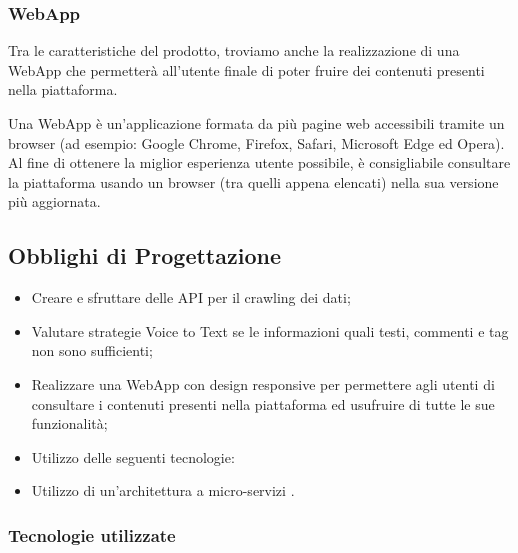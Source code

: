 \subsubsection{WebApp}

Tra le caratteristiche del prodotto, troviamo anche la realizzazione di una WebApp che permetterà all'utente finale di poter fruire dei contenuti presenti nella piattaforma.

Una WebApp \glo{} è un'applicazione formata da più pagine web accessibili tramite un browser (ad esempio: Google Chrome, Firefox, Safari, Microsoft Edge ed Opera). Al fine di ottenere la miglior esperienza utente possibile, è consigliabile consultare la piattaforma usando un browser (tra quelli appena elencati) nella sua versione più aggiornata.

\subsection{Obblighi di Progettazione}


\begin{itemize}
  \item Creare e sfruttare delle API \glo per il crawling \glo dei dati;
  \item Valutare strategie Voice to Text se le informazioni quali testi, commenti e tag non sono sufficienti;
  \item Realizzare una WebApp \glo con design responsive per permettere agli utenti di consultare i contenuti presenti nella piattaforma ed usufruire di tutte le sue funzionalità;
  \item Utilizzo delle seguenti tecnologie: 
  \item Utilizzo di un'architettura a micro-servizi \glo{}.
\end{itemize}

\subsubsection{Tecnologie utilizzate}

